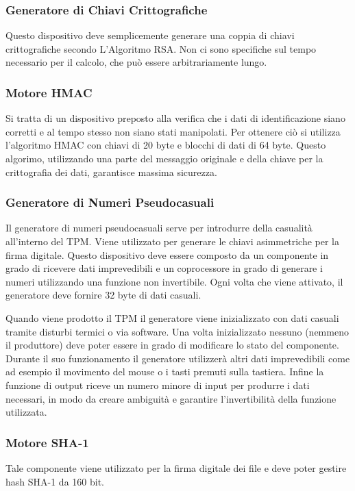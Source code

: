 \subsubsection{Generatore di Chiavi Crittografiche}
Questo dispositivo deve semplicemente generare una coppia di chiavi crittografiche secondo L'Algoritmo RSA. Non ci sono specifiche sul tempo necessario per il calcolo, che può essere arbitrariamente lungo.

\subsubsection{Motore HMAC}
Si tratta di un dispositivo preposto alla verifica che i dati di identificazione siano corretti e al tempo stesso non siano stati manipolati. Per ottenere ciò si utilizza l'algoritmo HMAC con chiavi di 20 byte e blocchi di dati di 64 byte. Questo algorimo, utilizzando una parte del messaggio originale e della chiave per la crittografia dei dati, garantisce massima sicurezza.

\subsubsection{Generatore di Numeri Pseudocasuali}
Il generatore di numeri pseudocasuali serve per introdurre della casualità all'interno del TPM. Viene utilizzato per generare le chiavi asimmetriche per la firma digitale. Questo dispositivo deve essere composto da un componente in grado di ricevere dati imprevedibili e un coprocessore in grado di generare i numeri utilizzando una funzione non invertibile. Ogni volta che viene attivato, il generatore deve fornire 32 byte di dati casuali.

Quando viene prodotto il TPM il generatore viene inizializzato con dati casuali tramite disturbi termici o via software. Una volta inizializzato nessuno (nemmeno il produttore) deve poter essere in grado di modificare lo stato del componente. Durante il suo funzionamento il generatore utilizzerà altri dati imprevedibili come ad esempio il movimento del mouse o i tasti premuti sulla tastiera. Infine la funzione di output riceve un numero minore di input per produrre i dati necessari, in modo da creare ambiguità e garantire l'invertibilità della funzione utilizzata.

\subsubsection{Motore SHA-1}
Tale componente viene utilizzato per la firma digitale dei file e deve poter gestire hash SHA-1 da 160 bit.

